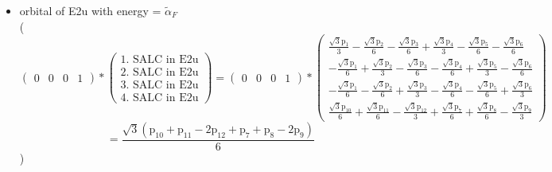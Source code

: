 \documentclass[12pt,a4paper]{article}
\begin{document}
\begin{itemize}
\textcolor{red}{Error in Orthogonalization of SALCs}\textcolor{red}{Error in Orthogonalization of SALCs}\textcolor{red}{Error in Orthogonalization of SALCs}\item orbital of E2u with energy = 
                                $\tilde{\alpha}_{F}$ \\
( 
$$
\begin{pmatrix}0 & 0 & 0 & 1\end{pmatrix} * \left(\begin{array}{c}\text{1. SALC in E2u} \\ \text{2. SALC in E2u} \\ \text{3. SALC in E2u} \\ \text{4. SALC in E2u}\end{array}\right) = \begin{pmatrix}0 & 0 & 0 & 1\end{pmatrix} * \begin{pmatrix}\frac{\sqrt{3} \text{p}_{1}}{3} - \frac{\sqrt{3} \text{p}_{2}}{6} - \frac{\sqrt{3} \text{p}_{3}}{6} + \frac{\sqrt{3} \text{p}_{4}}{3} - \frac{\sqrt{3} \text{p}_{5}}{6} - \frac{\sqrt{3} \text{p}_{6}}{6}\\- \frac{\sqrt{3} \text{p}_{1}}{6} + \frac{\sqrt{3} \text{p}_{2}}{3} - \frac{\sqrt{3} \text{p}_{3}}{6} - \frac{\sqrt{3} \text{p}_{4}}{6} + \frac{\sqrt{3} \text{p}_{5}}{3} - \frac{\sqrt{3} \text{p}_{6}}{6}\\- \frac{\sqrt{3} \text{p}_{1}}{6} - \frac{\sqrt{3} \text{p}_{2}}{6} + \frac{\sqrt{3} \text{p}_{3}}{3} - \frac{\sqrt{3} \text{p}_{4}}{6} - \frac{\sqrt{3} \text{p}_{5}}{6} + \frac{\sqrt{3} \text{p}_{6}}{3}\\\frac{\sqrt{3} \text{p}_{10}}{6} + \frac{\sqrt{3} \text{p}_{11}}{6} - \frac{\sqrt{3} \text{p}_{12}}{3} + \frac{\sqrt{3} \text{p}_{7}}{6} + \frac{\sqrt{3} \text{p}_{8}}{6} - \frac{\sqrt{3} \text{p}_{9}}{3}\end{pmatrix} 
 $$ $$ = \frac{\sqrt{3} \left(\text{p}_{10} + \text{p}_{11} - 2 \text{p}_{12} + \text{p}_{7} + \text{p}_{8} - 2 \text{p}_{9}\right)}{6} 
 $$ 
 )


\end{itemize}
\end{document}
